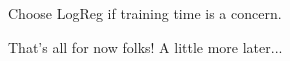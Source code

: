\vspace{-0.2cm}

Choose LogReg if training time is a concern.

That's all for now folks! A little more later...